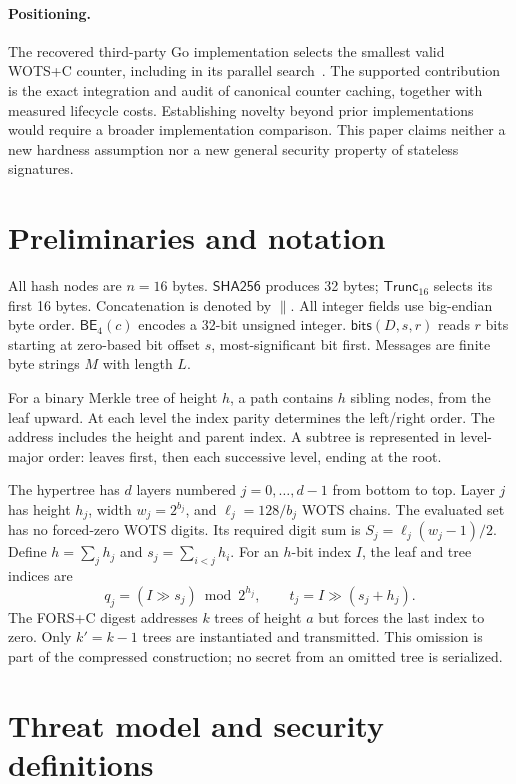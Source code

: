 \documentclass[a4paper,envcountsame,runningheads]{llncs}
\newcommand{\Hh}{\mathsf{SHA256}}
\newcommand{\Tr}{\mathsf{Trunc}_{16}}
\newcommand{\BE}{\mathsf{BE}_{4}}
\newcommand{\bits}{\mathsf{bits}}
\begin{document}
\paragraph{Positioning.}
The recovered third-party Go implementation selects the smallest valid WOTS+C counter, including in its parallel search~\cite{hashsiggo}. The supported contribution is the exact integration and audit of canonical counter caching, together with measured lifecycle costs. Establishing novelty beyond prior implementations would require a broader implementation comparison. This paper claims neither a new hardness assumption nor a new general security property of stateless signatures.

\section{Preliminaries and notation}\label{sec:notation}
All hash nodes are $n=16$ bytes. $\Hh$ produces 32 bytes; $\Tr$ selects its first 16 bytes. Concatenation is denoted by $\|$. All integer fields use big-endian byte order. $\BE(c)$ encodes a 32-bit unsigned integer. $\bits(D,s,r)$ reads $r$ bits starting at zero-based bit offset $s$, most-significant bit first. Messages are finite byte strings $M$ with length $L$.

For a binary Merkle tree of height $h$, a path contains $h$ sibling nodes, from the leaf upward. At each level the index parity determines the left/right order. The address includes the height and parent index. A subtree is represented in level-major order: leaves first, then each successive level, ending at the root.

The hypertree has $d$ layers numbered $j=0,\ldots,d-1$ from bottom to top. Layer $j$ has height $h_j$, width $w_j=2^{b_j}$, and $\ell_j=128/b_j$ WOTS chains. The evaluated set has no forced-zero WOTS digits. Its required digit sum is $S_j=\ell_j(w_j-1)/2$. Define $h=\sum_j h_j$ and $s_j=\sum_{i<j}h_i$. For an $h$-bit index $I$, the leaf and tree indices are
\begin{equation}\label{eq:route}
 q_j=(I\mathbin{\gg}s_j)\bmod 2^{h_j},\qquad
 t_j=I\mathbin{\gg}(s_j+h_j).
\end{equation}
The FORS+C digest addresses $k$ trees of height $a$ but forces the last index to zero. Only $k'=k-1$ trees are instantiated and transmitted. This omission is part of the compressed construction; no secret from an omitted tree is serialized.

\section{Threat model and security definitions}\label{sec:game}
\end{document}
